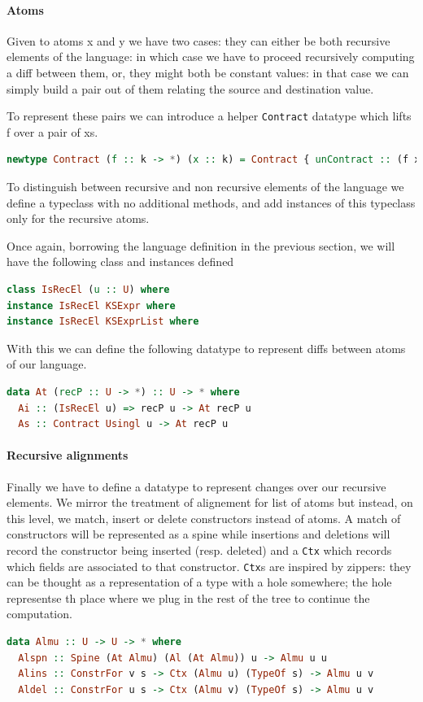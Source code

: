 \documentclass[11pt]{article}
\begin{document}
\paragraph{Atoms}\label{atoms}

Given to atoms x and y we have two cases: they can either be both recursive elements 
of the language: in which case we have to proceed recursively computing a diff 
between them, or, they might both be constant values: in that case we can simply 
build a pair out of them relating the source and destination value.

To represent these pairs we can introduce a helper \texttt{Contract} datatype which 
lifts f over a pair of xs.

\begin{lstlisting}[language=haskell]
  newtype Contract (f :: k -> *) (x :: k) = Contract { unContract :: (f x , f x) }
\end{lstlisting}

To distinguish between recursive and non recursive elements of the language we 
define a typeclass with no additional methods, and add instances of this typeclass only for the recursive atoms.

Once again, borrowing the language definition in the previous section, we will have the following 
class and instances defined
\begin{lstlisting}[language=haskell]
class IsRecEl (u :: U) where
instance IsRecEl KSExpr where
instance IsRecEl KSExprList where
\end{lstlisting}

With this we can define the following datatype to represent diffs between atoms of our language.
\begin{lstlisting}[language=haskell]
data At (recP :: U -> *) :: U -> * where
  Ai :: (IsRecEl u) => recP u -> At recP u
  As :: Contract Usingl u -> At recP u
\end{lstlisting}
\paragraph{Recursive alignments}\label{recursive alignments}

Finally we have to define a datatype to represent changes over our recursive 
elements. We mirror the treatment of alignement for list of atoms but instead, on this level, we 
match, insert or delete constructors instead of atoms. 
A match of constructors will be represented as a spine while insertions and 
deletions will record the constructor being inserted (resp. deleted) and a 
\texttt{Ctx} which records which fields are associated to that constructor.
\texttt{Ctx}s are inspired by zippers: they can be thought as a representation 
of a  type with a hole somewhere; the hole representse th place where we 
plug in the rest of the tree to continue the computation.
\begin{lstlisting}[language=haskell]
data Almu :: U -> U -> * where
  Alspn :: Spine (At Almu) (Al (At Almu)) u -> Almu u u
  Alins :: ConstrFor v s -> Ctx (Almu u) (TypeOf s) -> Almu u v
  Aldel :: ConstrFor u s -> Ctx (Almu v) (TypeOf s) -> Almu u v
\end{lstlisting}
\
\end{document}

